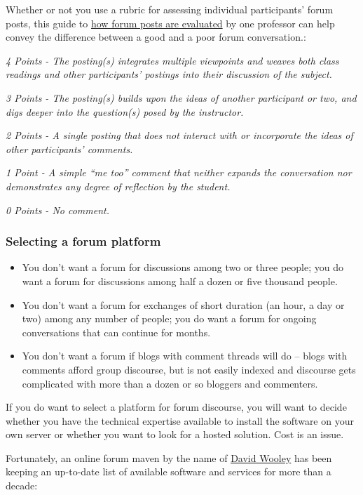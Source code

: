 Whether or not you use a rubric for assessing individual participants'
forum posts, this guide to
\href{http://www.wpi.edu/Academics/ATC/Collaboratory/Idea/boards.html}{how
forum posts are evaluated} by one professor can help convey the
difference between a good and a poor forum conversation.:

\emph{4 Points - The posting(s) integrates multiple viewpoints and
weaves both class readings and other participants' postings into their
discussion of the subject.}

\emph{3 Points - The posting(s) builds upon the ideas of another
participant or two, and digs deeper into the question(s) posed by the
instructor.}

\emph{2 Points - A single posting that does not interact with or
incorporate the ideas of other participants' comments.}

\emph{1 Point - A simple ``me too'' comment that neither expands the
conversation nor demonstrates any degree of reflection by the student.}

\emph{0 Points - No comment.}

\subsubsection{Selecting a forum platform}

\begin{itemize}
\item
  You don't want a forum for discussions among two or three people; you
  do want a forum for discussions among half a dozen or five thousand
  people.
\item
  You don't want a forum for exchanges of short duration (an hour, a day
  or two) among any number of people; you do want a forum for ongoing
  conversations that can continue for months.
\item
  You don't want a forum if blogs with comment threads will do -- blogs
  with comments afford group discourse, but is not easily indexed and
  discourse gets complicated with more than a dozen or so bloggers and
  commenters.
\end{itemize}
If you do want to select a platform for forum discourse, you will want
to decide whether you have the technical expertise available to install
the software on your own server or whether you want to look for a hosted
solution. Cost is an issue.

Fortunately, an online forum maven by the name of
\href{http://thinkofit.com/whoweare.htm}{David Wooley} has been keeping
an up-to-date list of available software and services for more than a
decade:

